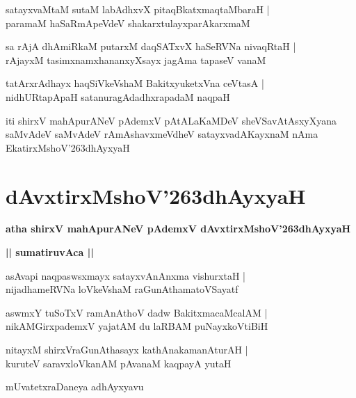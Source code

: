 \documentclass[twoside,12pt,openright]{book}
\def\S{\char'263}
\newcounter{shloka}[chapter]
\def\uvaca#1{\centerline{{\large\textbf{#1}}}}
\begin{document}
\begin{shloka}%
satayxvaMtaM sutaM labAdhxvX pitaqBkatxmaqtaMbaraH |\\
paramaM haSaRmApeVdeV shakarxtulayxparAkarxmaM 
\end{shloka}

\begin{shloka}%
sa rAjA dhAmiRkaM putarxM daqSATxvX haSeRVNa nivaqRtaH |\\
rAjayxM tasimxnamxhananxyXsayx jagAma tapaseV vanaM 
\end{shloka}

\begin{shloka}%
tatArxrAdhayx haqSiVkeVshaM BakitxyuketxVna ceVtasA |\\
nidhURtapApaH satanuragAdadhxrapadaM naqpaH 
\end{shloka}

\begin{center}
iti shirxV mahApurANeV pAdemxV pAtALaKaMDeV sheVSavAtAsxyXyana saMvAdeV 
saMvAdeV rAmAshavxmeVdheV satayxvadAKayxnaM nAma EkatirxMshoV\S dhAyxyaH
\end{center}

\chapter{dAvxtirxMshoV\S dhAyxyaH}

\begin{center}
{\LARGE\bfseries atha shirxV mahApurANeV pAdemxV dAvxtirxMshoV\S dhAyxyaH}
\end{center}

\uvaca{|| sumatiruvAca ||}

\begin{shloka}%
asAvapi naqpaswsxmayx satayxvAnAnxma vishurxtaH |\\
nijadhameRVNa loVkeVshaM raGunAthamatoVSayatf 
\end{shloka}

\begin{shloka}%
aswmxY tuSoTxV ramAnAthoV dadw BakitxmacaMcalAM |\\
nikAMGirxpademxV yajatAM du laRBAM puNayxkoVtiBiH 
\end{shloka}

\begin{shloka}%
nitayxM shirxVraGunAthasayx kathAnakamanAturAH |\\
kuruteV saravxloVkanAM pAvanaM kaqpayA yutaH 
\end{shloka}

\begin{center}
mUvatetxraDaneya adhAyxyavu
\end{center}
\end{document}
